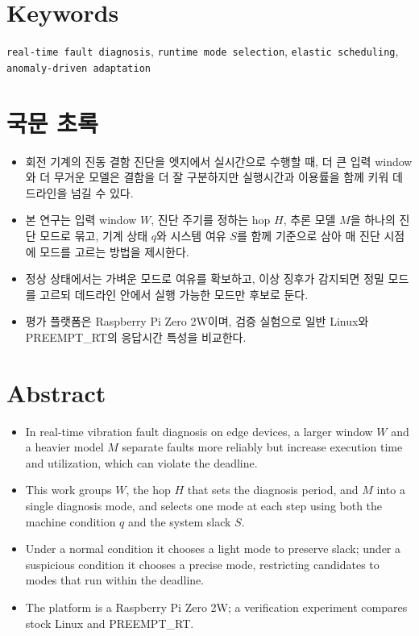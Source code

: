 \documentclass[10pt]{article}
\begin{document}
\section{Keywords}
\texttt{real-time fault diagnosis}, \texttt{runtime mode selection}, \texttt{elastic scheduling}, \texttt{anomaly-driven adaptation}

\section{국문 초록}
\begin{itemize}
\item 회전 기계의 진동 결함 진단을 엣지에서 실시간으로 수행할 때, 더 큰 입력 window와 더 무거운 모델은 결함을 더 잘 구분하지만 실행시간과 이용률을 함께 키워 데드라인을 넘길 수 있다.
\item 본 연구는 입력 window $W$, 진단 주기를 정하는 hop $H$, 추론 모델 $M$을 하나의 진단 모드로 묶고, 기계 상태 $q$와 시스템 여유 $S$를 함께 기준으로 삼아 매 진단 시점에 모드를 고르는 방법을 제시한다.
\item 정상 상태에서는 가벼운 모드로 여유를 확보하고, 이상 징후가 감지되면 정밀 모드를 고르되 데드라인 안에서 실행 가능한 모드만 후보로 둔다.
\item 평가 플랫폼은 Raspberry Pi Zero 2W이며, 검증 실험으로 일반 Linux와 PREEMPT\_RT의 응답시간 특성을 비교한다.
\end{itemize}

\section{Abstract}
\begin{itemize}
\item In real-time vibration fault diagnosis on edge devices, a larger window $W$ and a heavier model $M$ separate faults more reliably but increase execution time and utilization, which can violate the deadline.
\item This work groups $W$, the hop $H$ that sets the diagnosis period, and $M$ into a single diagnosis mode, and selects one mode at each step using both the machine condition $q$ and the system slack $S$.
\item Under a normal condition it chooses a light mode to preserve slack; under a suspicious condition it chooses a precise mode, restricting candidates to modes that run within the deadline.
\item The platform is a Raspberry Pi Zero 2W; a verification experiment compares stock Linux and PREEMPT\_RT.
\end{itemize}
\end{document}
